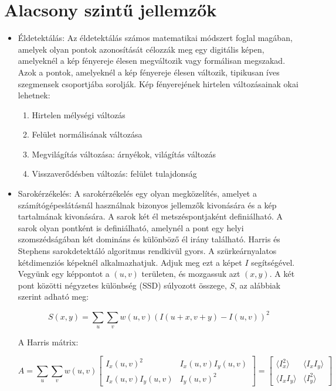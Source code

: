 \section{Alacsony szintű jellemzők}
\begin{itemize}
\item Éldetektálás: Az éldetektálás számos matematikai módszert foglal magában, amelyek olyan pontok azonosítását célozzák meg egy digitális képen, amelyeknél a kép fényereje élesen megváltozik vagy formálisan megszakad. Azok a pontok, amelyeknél a kép fényereje élesen változik, tipikusan íves szegmensek csoportjába sorolják.
Kép fényerejének hirtelen változásainak okai lehetnek:
\begin{enumerate}
\item Hirtelen mélységi változás
\item Felület normálisának változása
\item Megvilágítás változása: árnyékok, világítás változás
\item Visszaverődésben változás: felület tulajdonság
\end{enumerate}
\item Sarokérzékelés: A sarokérzékelés egy olyan megközelítés, amelyet a számítógépeslátásnál használnak bizonyos jellemzők kivonására és a kép tartalmának kivonására.
A sarok két él metszéspontjaként definiálható. A sarok olyan pontként is definiálható, amelynél a pont egy helyi szomszédságában két domináns és különböző él irány található.
Harris és Stephens sarokdetektáló algoritmus rendkivül gyors. A szürkeárnyalatos kétdimenziós képeknél alkalmazhatjuk. Adjuk meg ezt a képet $I$ segítségével. Vegyünk egy képpontot a $(u, v)$ területen, és mozgassuk azt $(x, y)$. A két pont közötti négyzetes különbség (SSD) súlyozott összege, $S$, az alábbiak szerint adható meg:

$$
S(x,y)=\sum_{u}\sum_{v}w(u,v)(I(u+x,v+y)-I(u,v))^{2}
$$

A Harris mátrix:

$$
{\displaystyle A=\sum _{u}\sum _{v}w(u,v){\begin{bmatrix}I_{x}(u,v)^{2}&I_{x}(u,v)I_{y}(u,v)\\I_{x}(u,v)I_{y}(u,v)&I_{y}(u,v)^{2}\end{bmatrix}}={\begin{bmatrix}\langle I_{x}^{2}\rangle &\langle I_{x}I_{y}\rangle \\\langle I_{x}I_{y}\rangle &\langle I_{y}^{2}\rangle \end{bmatrix}}}
$$


\end{itemize}
